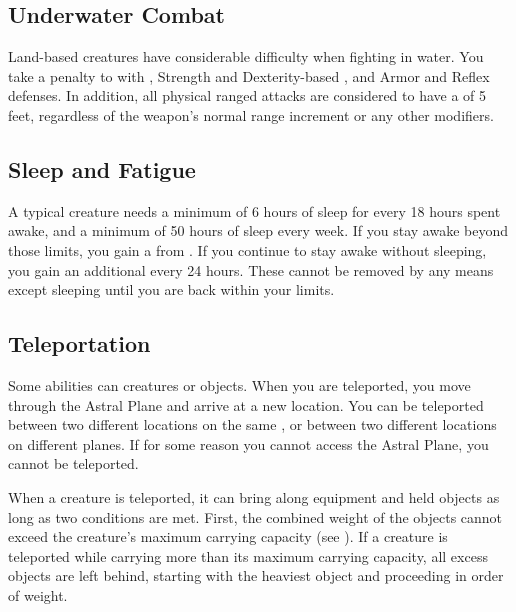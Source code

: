     \subsection{Underwater Combat}\label{Underwater Combat}
        Land-based creatures have considerable difficulty when fighting in water.
        You take a  penalty to  with , Strength and Dexterity-based , and Armor and Reflex defenses.
        In addition, all physical ranged attacks are considered to have a  of 5 feet, regardless of the weapon's normal range increment or any other modifiers.

    \subsection{Sleep and Fatigue}\label{Sleep and Fatigue}
        A typical creature needs a minimum of 6 hours of sleep for every 18 hours spent awake, and a minimum of 50 hours of sleep every week.
        If you stay awake beyond those limits, you gain a  from .
        If you continue to stay awake without sleeping, you gain an additional  every 24 hours.
        These  cannot be removed by any means except sleeping until you are back within your limits.

    \subsection{Teleportation}\label{Teleportation}
        Some abilities can  creatures or objects.
        When you are teleported, you move through the Astral Plane and arrive at a new location.
        You can be teleported between two different locations on the same , or between two different locations on different planes.
        If for some reason you cannot access the Astral Plane, you cannot be teleported.

        When a creature is teleported, it can bring along equipment and held objects as long as two conditions are met.
        First, the combined weight of the objects cannot exceed the creature's maximum carrying capacity (see ).
        If a creature is teleported while carrying more than its maximum carrying capacity, all excess objects are left behind, starting with the heaviest object and proceeding in order of weight.

